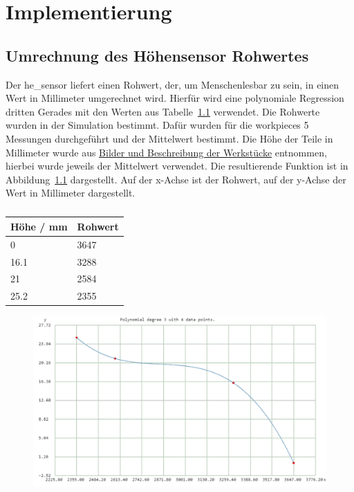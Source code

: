 \chapter{Implementierung}\label{ch:implementierung}


\section{Umrechnung des Höhensensor Rohwertes}\label{sec:hoehensensor-rohwert-umrechnung}

Der \gls{he_sensor} liefert einen Rohwert, der, um Menschenlesbar zu sein, in einen
Wert in Millimeter umgerechnet wird.
Hierfür wird eine polynomiale Regression dritten Gerades mit den Werten aus Tabelle~\ref{tab:regression} verwendet.
Die Rohwerte wurden in der Simulation bestimmt.
Dafür wurden für die \glspl{workpiece} 5 Messungen durchgeführt und der Mittelwert bestimmt.
Die Höhe der Teile in Millimeter wurde aus
\href{https://emil.haw-hamburg.de/mod/page/view.php?id=2340511} {Bilder und Beschreibung der Werkstücke}
entnommen, hierbei wurde jeweils der Mittelwert verwendet.
Die resultierende Funktion ist in Abbildung~\ref{fig:regression} dargestellt.
Auf der x-Achse ist der Rohwert, auf der y-Achse der Wert in Millimeter dargestellt.

\begin{table}
    \centering
    \begin{tabular}{|l|l|}
        \hline
        Höhe / mm & Rohwert \\ \hline
        0         & 3647    \\ \hline
        16.1      & 3288    \\ \hline
        21        & 2584    \\ \hline
        25.2      & 2355    \\ \hline
    \end{tabular}
    \caption{}
    \label{tab:regression}
\end{table}

\begin{figure}[h]
    \centering
    \includegraphics[width=\textwidth]{../images/regression}
    \caption{}
    \label{fig:regression}
\end{figure}


